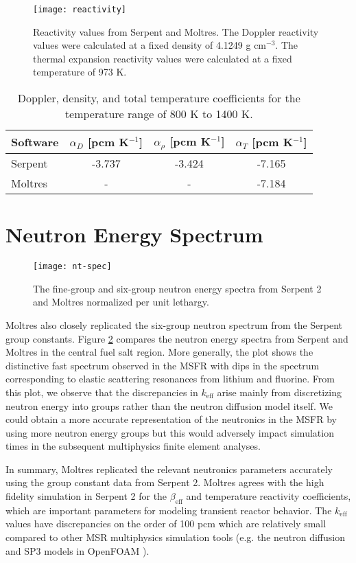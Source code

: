 \begin{figure}[htb!]
    \centering
    \texttt{[image: reactivity]}
    \caption{Reactivity values from Serpent and Moltres. The Doppler
    reactivity values were calculated at a fixed density of 4.1249 g
    cm$^{-3}$. The thermal expansion reactivity values were calculated at a
    fixed temperature of 973 K.}
    \label{fig:reactivity}
\end{figure}
%
\begin{table}[htb!]
	\centering
	\caption{Doppler, density, and total temperature coefficients
	for the temperature range of 800 K to 1400 K.}
	\begin{tabular}{l S S S}
		\toprule
		{Software} & {$\alpha_D$ [pcm
		K$^{-1}$]} & {$\alpha_\rho$ [pcm K$^{-1}$]} & {$\alpha_T$ [pcm
		K$^{-1}$]} \\
		\midrule
		{Serpent} & -3.737  & -3.424  &
		-7.165  \\
		{Moltres} & {-} & {-} & -7.184\\
		\bottomrule
	\end{tabular}
	\label{table:alpha}
\end{table}

\section{Neutron Energy Spectrum}

\begin{figure}[htb!]
    \centering
    \texttt{[image: nt-spec]}
    \caption{The fine-group and six-group neutron energy spectra from Serpent
    2 and Moltres normalized per unit lethargy.}
    \label{fig:ntspec}
\end{figure}

Moltres also closely replicated the six-group neutron spectrum from the
Serpent group constants. Figure \ref{fig:ntspec} compares the neutron energy
spectra from Serpent and Moltres in the central fuel salt region. More
generally, the
plot shows the distinctive fast spectrum observed in the \gls{MSFR} with dips
in the spectrum corresponding to elastic scattering resonances from lithium
and fluorine. From this plot, we observe that the discrepancies in
$k_{\text{eff}}$ arise mainly from discretizing neutron energy into groups
rather than the neutron diffusion model itself. We could obtain a more
accurate representation of the neutronics in the \gls{MSFR} by using more
neutron energy groups but this would adversely impact simulation times in the
subsequent multiphysics finite element analyses.

In summary, Moltres replicated the relevant neutronics parameters
accurately using the group constant data from Serpent 2. Moltres agrees with
the high fidelity simulation in Serpent 2 for the $\beta_{\text{eff}}$ and
temperature reactivity coefficients, which are important parameters for
modeling transient reactor behavior. The $k_{\text{eff}}$ values have
discrepancies on the order of 100 pcm which are relatively small compared
to other \gls{MSR} multiphysics simulation tools (e.g. the neutron diffusion
and SP3 models in OpenFOAM \cite{cervi_development_2019}).
